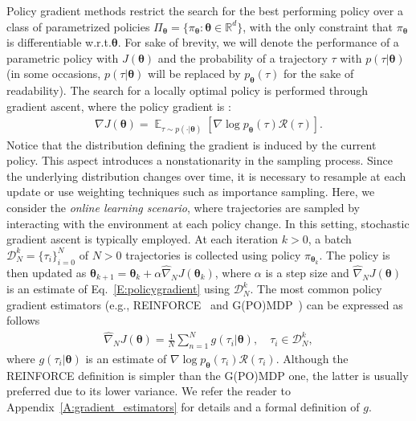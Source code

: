 \documentclass{article}
\makeatletter
\theoremstyle{remark}
\theoremstyle{definition}
\DeclareRobustCommand{\eg}{e.g.,\@\xspace}
\DeclareRobustCommand{\wrt}{w.r.t.\@\xspace}
\newcommand{\realspace}{\mathbb R}      %
\DeclareMathOperator*{\EV}{\mathbb{E}}
\newcommand{\EVV}[2][\ppvect \in \ppspace]{\EV_{#1}\left[{#2}\right]}
\newcommand{\de}{\,\mathrm{d}}
\newcommand{\vtheta}{\boldsymbol{\theta}}
\newcommand{\Tspace}{\mathcal{T}}
\newcommand{\Reward}{\mathcal{R}}
\newcommand{\pol}{\pi_{\vtheta}}
\newcommand{\score}[2]{\nabla\log p_{#1}(#2)}
\newcommand{\gradJ}[1]{\nabla J(#1)}
\newcommand{\gradApp}[2]{\widehat{\nabla}_{#2}J(#1)}
\makeatother
\begin{document}
Policy gradient methods restrict the search for the best performing policy over a class of parametrized policies $\Pi_{\vtheta}=\{\pol: \vtheta \in \realspace^d\}$, with the only constraint that $\pol$ is differentiable \wrt $\vtheta$. For sake of brevity, we will denote the performance of a parametric policy with $J(\vtheta)$ and the probability of a trajectory $\tau$ with $p(\tau|\vtheta)$ (in some occasions, $p(\tau|\vtheta)$ will be replaced by $p_{\vtheta}(\tau)$ for the sake of readability).
The search for a locally optimal policy is performed through gradient ascent, where the policy gradient
is \cite{sutton2000policy, Peters2008reinf}:
\begin{align} \label{E:policygradient}
        \gradJ{\vtheta} = \EVV[\tau \sim p(\cdot|\vtheta)]{\score{\vtheta}{\tau}\Reward(\tau)}.
\end{align}
Notice that the distribution defining the gradient is induced by the current policy. This aspect introduces a nonstationarity in the sampling process. Since the underlying distribution changes over time, it is necessary to resample at each update or use weighting techniques such as importance sampling.
Here, we consider the \emph{online learning scenario}, where trajectories are sampled by interacting with the environment at each policy change. 
In this setting, stochastic gradient ascent is typically employed.
At each iteration $k >0$, a batch $\mathcal{D}_N^k = \{\tau_i\}_{i=0}^N$ of $N>0$ trajectories is collected using policy $\pi_{\vtheta_k}$.
The policy is then updated as $\vtheta_{k+1}  = \vtheta_k + \alpha\gradApp{\vtheta_k}{N}$, where $\alpha$ is a step size and $\gradApp{\vtheta}{N}$ is an estimate of Eq.~\eqref{E:policygradient} using $\mathcal{D}_N^k$. The most common policy gradient estimators (\eg REINFORCE~\citep{williams1992simple} and G(PO)MDP~\citep{baxter2001infinite}) can be expressed as follows
\begin{align} \label{E:policygradient.estimate}
        \gradApp{\vtheta}{N} = \frac{1}{N}\sum_{n=1}^{N} g(\tau_i|\vtheta), \quad \tau_i \in \mathcal{D}_N^k,
\end{align}
where $g(\tau_i|\vtheta)$ is an estimate of $\score{\vtheta}{\tau_i}\Reward(\tau_i)$.
Although the REINFORCE definition is simpler than the G(PO)MDP one, the latter is usually preferred due to its lower variance.
We refer the reader to Appendix~\ref{A:gradient_estimators} for details and a formal definition of $g$.
\end{document}
